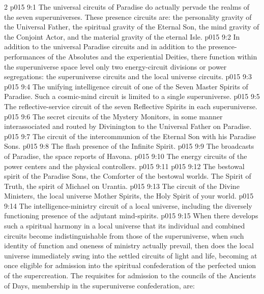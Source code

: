 \begin{multicols}{2}
\vs p015 9:1 The universal circuits of Paradise do actually pervade the realms of the seven superuniverses. These presence circuits are: the personality gravity of the Universal Father, the spiritual gravity of the Eternal Son, the mind gravity of the Conjoint Actor, and the material gravity of the eternal Isle.
\vs p015 9:2 In addition to the universal Paradise circuits and in addition to the presence\hyp{}performances of the Absolutes and the experiential Deities, there function within the superuniverse space level only two energy\hyp{}circuit divisions or power segregations: the superuniverse circuits and the local universe circuits.
\pc \vs p015 9:3 
\pc \vs p015 9:4 \bibnobreakspace The unifying intelligence circuit of one of the Seven Master Spirits of Paradise. Such a cosmic\hyp{}mind circuit is limited to a single superuniverse.
\vs p015 9:5 \bibnobreakspace The reflective\hyp{}service circuit of the seven Reflective Spirits in each superuniverse.
\vs p015 9:6 \bibnobreakspace The secret circuits of the Mystery Monitors, in some manner interassociated and routed by Divinington to the Universal Father on Paradise.
\vs p015 9:7 \bibnobreakspace The circuit of the intercommunion of the Eternal Son with his Paradise Sons.
\vs p015 9:8 \bibnobreakspace The flash presence of the Infinite Spirit.
\vs p015 9:9 \bibnobreakspace The broadcasts of Paradise, the space reports of Havona.
\vs p015 9:10 \bibnobreakspace The energy circuits of the power centers and the physical controllers.
\pc \vs p015 9:11 
\pc \vs p015 9:12 \bibnobreakspace The bestowal spirit of the Paradise Sons, the Comforter of the bestowal worlds. The Spirit of Truth, the spirit of Michael on Urantia.
\vs p015 9:13 \bibnobreakspace The circuit of the Divine Ministers, the local universe Mother Spirits, the Holy Spirit of your world.
\vs p015 9:14 \bibnobreakspace The intelligence\hyp{}ministry circuit of a local universe, including the diversely functioning presence of the adjutant mind\hyp{}spirits.
\pc \vs p015 9:15 When there develops such a spiritual harmony in a local universe that its individual and combined circuits become indistinguishable from those of the superuniverse, when such identity of function and oneness of ministry actually prevail, then does the local universe immediately swing into the settled circuits of light and life, becoming at once eligible for admission into the spiritual confederation of the perfected union of the supercreation. The requisites for admission to the councils of the Ancients of Days, membership in the superuniverse confederation, are:

\end{multicols}
